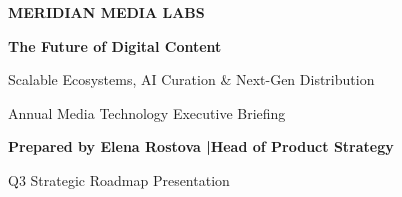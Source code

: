 \documentclass[aspectratio=169,11pt]{beamer}
\begin{document}
{
\begin{frame}[plain]
  \vspace*{24pt}
  \begin{center}
    {\color{accentcyan}\large\bfseries\faTv\quad MERIDIAN MEDIA LABS} \par
    \vspace{14pt}
    {\fontsize{26pt}{32pt}\selectfont \color{white}\bfseries The Future of Digital Content} \par
    \vspace{8pt}
    {\fontsize{15pt}{20pt}\selectfont \color{accentcyan}\mdseries Scalable Ecosystems, AI Curation \& Next-Gen Distribution} \par
    \vspace{20pt}
    \vspace{20pt}
    
    {\small\color{textlight} Annual Media Technology Executive Briefing} \par
    \vspace{6pt}
    {\small\color{white}\bfseries Prepared by Elena Rostova \quad|\quad Head of Product Strategy} \par
    \vspace{4pt}
    {\tiny\color{textlight} Q3 Strategic Roadmap Presentation}
  \end{center}
\end{frame}
}
\end{document}
